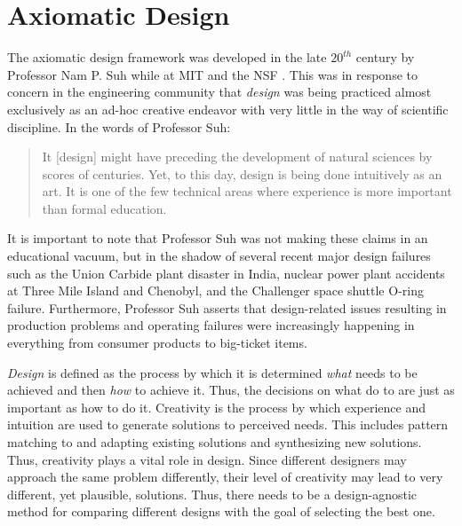 \section{Axiomatic Design}

The axiomatic design framework was developed in the late \(20^{th}\) century by Professor Nam P. Suh while at MIT
and the NSF \cite{suh}.  This was in response to concern in the engineering community that \emph{design} was being
practiced almost exclusively as an ad-hoc creative endeavor with very little in the way of scientific discipline.
In the words of Professor Suh:
\begin{quote}
  It [design] might have preceding the development of natural sciences by scores of centuries.  Yet, to this day,
  design is being done intuitively as an art.  It is one of the few technical areas where experience is more
  important than formal education.
\end{quote}
It is important to note that Professor Suh was not making these claims in an educational vacuum, but in the shadow
of several recent major design failures such as the Union Carbide plant disaster in India, nuclear power plant
accidents at Three Mile Island and Chenobyl, and the Challenger space shuttle O-ring failure.  Furthermore,
Professor Suh asserts that design-related issues resulting in production problems and operating failures were
increasingly happening in everything from consumer products to big-ticket items.

\emph{Design} is defined as the process by which it is determined \emph{what} needs to be achieved and then
\emph{how} to achieve it.  Thus, the decisions on what do to are just as important as how to do it.  Creativity is
the process by which experience and intuition are used to generate solutions to perceived needs.  This includes
pattern matching to and adapting existing solutions and synthesizing new solutions.  Thus, creativity plays a vital
role in design.  Since different designers may approach the same problem differently, their level of creativity may
lead to very different, yet plausible, solutions.  Thus, there needs to be a design-agnostic method for comparing
different designs with the goal of selecting the best one.

